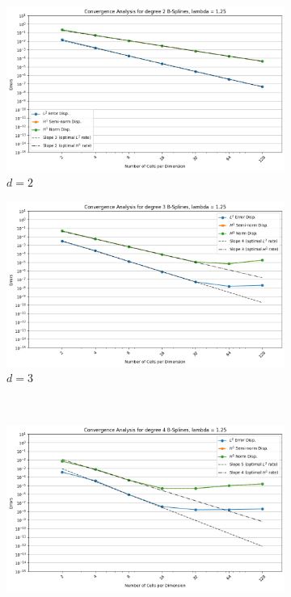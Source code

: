 \documentclass[a4paper,12pt,twoside]{report}
\begin{document}
\begin{figure}[!h]
	\centering
	\begin{subfigure}[b]{0.49\textwidth}
		\centering
		\includegraphics[width=\textwidth]{figures_non_mixed/convergence_plot_degree_2_lambda=1.25.png}
		\caption{$d=2$}
		\label{fig:deg2_NM}
	\end{subfigure}
	\begin{subfigure}[b]{0.49\textwidth}
		\centering
		\includegraphics[width=\textwidth]{figures_non_mixed/convergence_plot_degree_3_lambda=1.25.png}
		\caption{$d=3$}
		\label{fig:deg3_NM}
	\end{subfigure}
	\\
	\begin{subfigure}[b]{0.49\textwidth}
		\centering
		\includegraphics[width=\textwidth]{figures_non_mixed/convergence_plot_degree_4_lambda=1.25.png}

\end{subfigure}
\end{figure}
\end{document}
